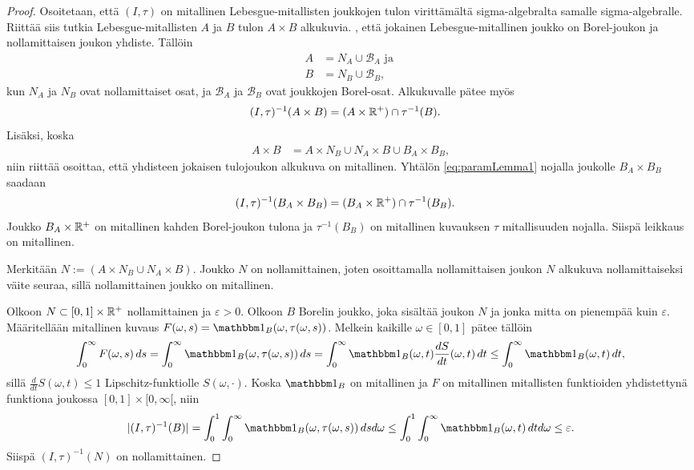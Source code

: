 \documentclass[12pt,oneside,a4paper]{amsbook} %
\begin{document}
\begin{proof}
    Osoitetaan, että $(I, \tau)$ on mitallinen Lebesgue-mitallisten joukkojen tulon virittämältä sigma-algebralta samalle sigma-algebralle. Riittää siis tutkia Lebesgue-mitallisten $A$ ja $B$ tulon $A \times B$ alkukuvia. , että jokainen Lebesgue-mitallinen joukko on Borel-joukon ja nollamittaisen joukon yhdiste. Tällöin
    \begin{align*}
        A &= N_A \cup \mathcal{B}_A \text{ ja } \\
        B &= N_B \cup \mathcal{B}_B,
    \end{align*}
    kun $N_A$ ja $N_B$ ovat nollamittaiset osat, ja $\mathcal{B}_A$ ja $\mathcal{B}_B$ ovat joukkojen Borel-osat. Alkukuvalle pätee myös
    \begin{align}\label{eq:paramLemma1}
        (I, \tau)^{-1}(A\times B) &= (A \times {\mathbb{R}^{+}}) \cap \tau^{-1}(B).
    \end{align}
    Lisäksi, koska 
    \begin{align}
        A \times B &= A \times N_B \cup N_A \times B \cup B_A \times B_B,
    \end{align}
    niin riittää osoittaa, että yhdisteen jokaisen tulojoukon alkukuva on mitallinen. Yhtälön \eqref{eq:paramLemma1} nojalla joukolle $B_A \times B_B$ saadaan
    \begin{align*}
        (I, \tau)^{-1}(B_A\times B_B) &= (B_A \times {\mathbb{R}^{+}}) \cap \tau^{-1}(B_B).
    \end{align*}
    Joukko $B_A \times {\mathbb{R}^{+}}$ on mitallinen kahden Borel-joukon tulona ja $\tau^{-1}(B_B)$ on mitallinen kuvauksen $\tau$ mitallisuuden nojalla. Siispä leikkaus on mitallinen.
    
    Merkitään $N:= (A \times N_B \cup N_A \times B)$. Joukko $N$ on nollamittainen, joten osoittamalla nollamittaisen joukon $N$ alkukuva nollamittaiseksi väite seuraa, sillä nollamittainen joukko on mitallinen.
    
    Olkoon $N \subset [0, 1] \times {\mathbb{R}^{+}}$ nollamittainen ja $\varepsilon > 0$. Olkoon $B$ Borelin joukko, joka sisältää joukon $N$ ja jonka mitta on pienempää kuin $\varepsilon$. Määritellään mitallinen kuvaus $F(\omega, s) = \indfct{B}(\omega, \tau(\omega, s))$. Melkein kaikille $\omega \in [0,1]$ pätee tällöin
    \begin{align}
        \int_0^\infty F(\omega, s) \, ds = \int_0^\infty \indfct{B}(\omega, \tau(\omega, s))\, ds = \int_0^\infty \indfct{B}(\omega, t)\frac{d S}{d t}(\omega, t) \, dt \le \int_0^\infty \indfct{B}(\omega, t)\, dt,
    \end{align}
    sillä $\frac{d}{dt}S(\omega, t)\le 1$ Lipschitz-funktiolle $S(\omega, \cdot)$. Koska $\indfct{B}$ on mitallinen ja $F$ on mitallinen mitallisten funktioiden yhdistettynä funktiona joukossa $[0, 1] \times [0, \infty[$, niin
    \begin{align*}
        |(I, \tau)^{-1}(B)| = \int_0^1\int_0^\infty \indfct{B}(\omega, \tau(\omega, s)) \, dsd\omega \le \int_0^1\int_0^\infty \indfct{B}(\omega, t) \, dtd\omega \le \varepsilon.
    \end{align*}
Siispä $(I, \tau)^{-1}(N)$ on nollamittainen.
\end{proof}
\end{document}
